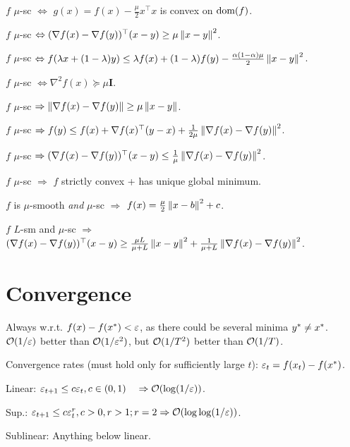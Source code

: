 $f$ $\mu$-sc $\Leftrightarrow$ $g(x) = f(x) - \frac{\mu}{2} x^\top x$ is convex on $\operatorname*{\text{dom}}(f)$.

$f$ $\mu$-sc $\Leftrightarrow (\nabla f(x) - \nabla f(y))^\top (x-y) \geq \mu \left\lVert x-y \right\rVert^2$.

$f$ $\mu$-sc $\Leftrightarrow f(\lambda x + (1-\lambda)y) \leq \lambda f(x) + (1-\lambda) f(y) - \frac{\alpha(1-\alpha)\mu}{2} \left\lVert x-y \right\rVert^2$.

$f$ $\mu$-sc $\Leftrightarrow \nabla^2 f(x) \succeq \mu \mathbf{I}$.

$f$ $\mu$-sc $\Rightarrow \left\lVert \nabla f(x) - \nabla f(y) \right\rVert \geq \mu \left\lVert x-y \right\rVert$.

$f$ $\mu$-sc $\Rightarrow f(y) \leq f(x) + \nabla f(x)^\top (y-x) + \frac{1}{2\mu} \left\lVert \nabla f(x) - \nabla f(y) \right\rVert^2$.

$f$ $\mu$-sc $\Rightarrow (\nabla f (x) - \nabla f(y))^\top (x-y) \leq \frac{1}{\mu} \left\lVert \nabla f(x) - \nabla f(y) \right\rVert^2$.

$f$ $\mu$-sc $\Rightarrow$ $f$ strictly convex + has unique global minimum.

$f$ is $\mu$-smooth \textit{and} $\mu$-sc $\Rightarrow$ $f(x) = \frac{\mu}{2} \left\lVert x - b \right\rVert^2 + c$.

$f$ $L$-sm and $\mu$-sc $\Rightarrow$ $(\nabla f(x) - \nabla f(y))^\top (x-y) \geq \frac{\mu L}{\mu + L} \left\lVert x-y \right\rVert^2 + \frac{1}{\mu + L} \left\lVert \nabla f(x) - \nabla f(y) \right\rVert^2$.

\section*{Convergence}
Always w.r.t. $f(x) - f(x^*) < \varepsilon$, as there could be several minima $y^* \neq x^*$. $\mathcal{O}(1/\varepsilon)$ better than $\mathcal{O}(1/\varepsilon^2)$, but $\mathcal{O}(1/T^2)$ better than $\mathcal{O}(1/T)$.

Convergence rates (must hold only for sufficiently large $t$): $\varepsilon_t = f(x_t) - f(x^*)$.

Linear: $\varepsilon_{t+1} \leq c \varepsilon_t, c \in (0,1) \quad \Rightarrow \mathcal{O}(\log(1/\varepsilon))$.

Sup.: $\varepsilon_{t+1} \leq c \varepsilon_t^r, c > 0, r > 1; r=2 \Rightarrow \mathcal{O}(\log\log (1/\varepsilon))$.

Sublinear: Anything below linear.


